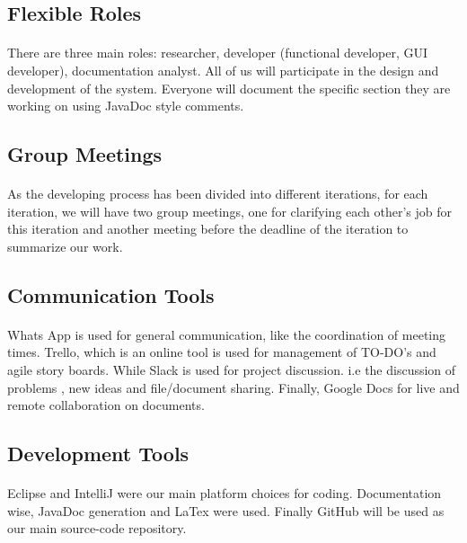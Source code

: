 \documentclass[11pt, a4]{article}
\begin{document}
\subsection{Flexible Roles}\label{roles}
\paragraph{}
There are three main roles: researcher, developer (functional developer, GUI developer), documentation analyst. All of us will participate in the design and development of the system. Everyone will document the specific section they are working on using JavaDoc style comments.

\subsection{Group Meetings}\label{gm}
\paragraph{}
As the developing process has been divided into different iterations, for each iteration, we will have two group meetings, one for clarifying each other's job for this iteration and another meeting before the deadline of the
iteration to summarize our work.

\subsection{Communication Tools}\label{comm:tools}
\paragraph{}
Whats App is used for general communication, like the coordination of meeting times. Trello, which is an online tool is used for management of TO-DO's and agile story boards. While Slack is used for project discussion. i.e the discussion of problems , new ideas and file/document sharing. Finally, Google Docs for live and remote collaboration on documents.
\subsection{Development Tools}\label{dev:tools}
\paragraph{}
Eclipse and IntelliJ were our main platform choices for coding. Documentation wise, JavaDoc generation and LaTex were used. Finally GitHub will be used as our main source-code repository.
\end{document}
